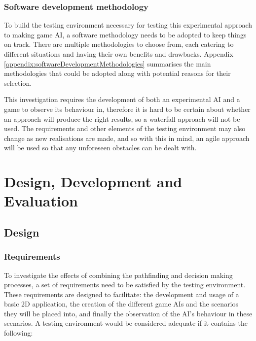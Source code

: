 \documentclass[11pt, a4paper]{report}
\begin{document}
\subsection{Software development methodology}
\label{subsec:softwareDevelopmentMethodology}

To build the testing environment necessary for testing this experimental approach to making game AI, a software methodology needs to be adopted to keep things on track. There are multiple methodologies to choose from, each catering to different situations and having their own benefits and drawbacks. Appendix \ref{appendix:softwareDevelopmentMethodologies} summarises the main methodologies that could be adopted along with potential reasons for their selection.

This investigation requires the development of both an experimental AI and a game to observe its behaviour in, therefore it is hard to be certain about whether an approach will produce the right results, so a waterfall approach will not be used. The requirements and other elements of the testing environment may also change as new realisations are made, and so with this in mind, an agile approach will be used so that any unforeseen obstacles can be dealt with.

\chapter{Design, Development and Evaluation}
\label{chapter:designDevelopmentAndEvaluation}

\section{Design}
\label{sec:design}

\subsection{Requirements}
\label{subsec:requirements}

To investigate the effects of combining the pathfinding and decision making processes, a set of requirements need to be satisfied by the testing environment. These requirements are designed to facilitate: the development and usage of a basic 2D application, the creation of the different game AIs and the scenarios they will be placed into, and finally the observation of the AI's behaviour in these scenarios. A testing environment would be considered adequate if it contains the following:
\end{document}
